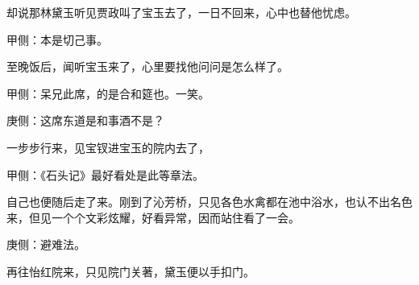 \begin{parag}
    却说那林黛玉听见贾政叫了宝玉去了，一日不回来，心中也替他忧虑。\begin{note}甲侧：本是切己事。\end{note}至晚饭后，闻听宝玉来了，心里要找他问问是怎么样了。\begin{note}甲侧：呆兄此席，的是合和筵也。一笑。\end{note}\begin{note}庚侧：这席东道是和事酒不是？\end{note}一步步行来，见宝钗进宝玉的院内去了，\begin{note}甲侧：《石头记》最好看处是此等章法。\end{note}自己也便随后走了来。刚到了沁芳桥，只见各色水禽都在池中浴水，也认不出名色来，但见一个个文彩炫耀，好看异常，因而站住看了一会。\begin{note}庚侧：避难法。\end{note}再往怡红院来，只见院门关著，黛玉便以手扣门。
\end{parag}


